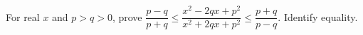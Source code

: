 For real $x$ and $p>q>0$, prove $\dfrac{p-q}{p+q}\le\dfrac{x^2-2qx+p^2}{x^2+2qx+p^2}\le\dfrac{p+q}{p-q}$. Identify equality.
